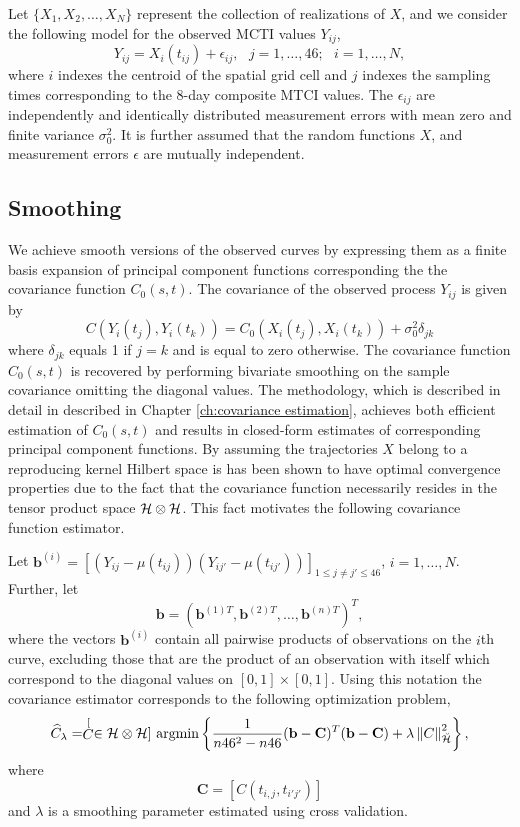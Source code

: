 Let $\{X_{1},X_{2},\dots,X_{N}\}$ represent the collection of realizations of $X$, and we consider the following model for the observed MCTI values $Y_{ij}$,
\[ Y_{ij}=X_{i}(t_{ij})+\epsilon_{ij},\mbox{ }j=1,\dots,46;\mbox{ }i=1,\dots,N, \]
where $i$ indexes the centroid of the spatial grid cell and $j$ indexes the sampling times corresponding to the 8-day composite MTCI values. The $\epsilon_{ij}$ are independently and identically distributed measurement errors with mean zero and finite variance $\sigma_{0}^{2}.$ It is further assumed that the random functions $X$, and measurement errors $\epsilon$ are mutually independent. 

\subsection{Smoothing} 

\label{sub:smoothing}
We achieve smooth versions of the observed curves by expressing them as a finite basis expansion of principal component functions corresponding the the covariance function $C_0(s,t)$. The covariance of the observed process $Y_{ij}$ is given by
\begin{equation}
	C(Y_i(t_j), Y_i(t_k)) = C_0(X_i(t_j), X_i(t_k)) + \sigma^2_0 \delta_{jk}
\end{equation}
where $\delta_{jk}$ equals 1 if $j=k$ and is equal to zero otherwise. The covariance function $C_0(s,t)$ is recovered by performing bivariate smoothing on the sample covariance omitting the diagonal values. The methodology, which is described in detail in described in Chapter \ref{ch:covariance estimation}, achieves both efficient estimation of $C_0(s,t)$ and results in closed-form estimates of corresponding principal component functions. By assuming the trajectories $X$ belong to a reproducing kernel Hilbert space is has been shown to have optimal convergence properties due to the fact that the covariance function necessarily resides in the tensor product space $\mathcal{H}\otimes\mathcal{H}$. This fact motivates the following covariance function estimator.

Let $\mathbf{b}^{(i)} = [(Y_{ij}-\mu(t_{ij}))(Y_{ij'}-\mu(t_{ij'}))]_{1\leq j\neq j'\leq 46}$, $i=1, \dots, N$. Further, let
\[ \mathbf{b} = (\mathbf{b}^{(1)T}, \mathbf{b}^{(2)T}, \dots, \mathbf{b}^{(n)T} )^T, \]
where the vectors $\mathbf{b}^{(i)}$ contain all pairwise products of observations on the $i$th curve, excluding those that are the product of an observation with itself which correspond to the diagonal values on $[0,1]\times [0,1]$. Using this notation the covariance estimator corresponds to the following optimization problem,
\begin{equation}
	 \widehat{C}_{\lambda}=\stackrel[C \in \mathcal{H}\otimes \mathcal{H}]{}{\text{ argmin}} \left\{\frac{1}{n46^2-n46} (\mathbf{b} - \mathbf{C})^T(\mathbf{b} - \mathbf{C})+\lambda\left\Vert C\right\Vert _{\breve{\mathcal{H}}}^{2} \right\},
	 \label{pheno: cov est}
	 \end{equation}
where
\[ \mathbf{C} = [C(t_{i,j}, t_{i'j'})] \]
and $\lambda$ is a smoothing parameter estimated using cross validation.


